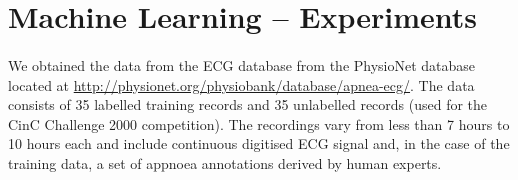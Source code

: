 \section{Machine Learning -- Experiments}

\paragraph{}
	We obtained the data from the ECG database from the PhysioNet database located at \url{http://physionet.org/physiobank/database/apnea-ecg/}. The data consists of 35 labelled training records and 35 unlabelled records (used for the CinC Challenge 2000 competition). The recordings vary from less than 7 hours to 10 hours each and include continuous digitised ECG signal and, in the case of the training data, a set of appnoea annotations derived by human experts.


 

